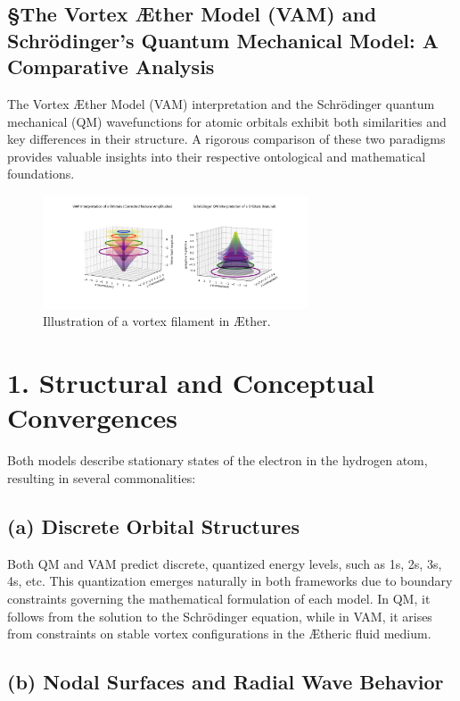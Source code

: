 

\subsection{\S The Vortex Æther Model (VAM) and Schrödinger's Quantum Mechanical Model: A Comparative Analysis}

The Vortex Æther Model (VAM) interpretation and the Schrödinger quantum mechanical (QM) wavefunctions for atomic orbitals exhibit both similarities and key differences in their structure. A rigorous comparison of these two paradigms provides valuable insights into their respective ontological and mathematical foundations.

\begin{figure}[h]
    \centering
    \includegraphics[width=0.7\textwidth]{vortex_diagram}
    \caption{Illustration of a vortex filament in Æther.}
    \label{fig:vortex}
\end{figure}

\section*{1. Structural and Conceptual Convergences}

Both models describe stationary states of the electron in the hydrogen atom, resulting in several commonalities:

\subsection*{(a) Discrete Orbital Structures}

Both QM and VAM predict discrete, quantized energy levels, such as 1s, 2s, 3s, 4s, etc. This quantization emerges naturally in both frameworks due to boundary constraints governing the mathematical formulation of each model. In QM, it follows from the solution to the Schrödinger equation, while in VAM, it arises from constraints on stable vortex configurations in the Ætheric fluid medium.

\subsection*{(b) Nodal Surfaces and Radial Wave Behavior}

